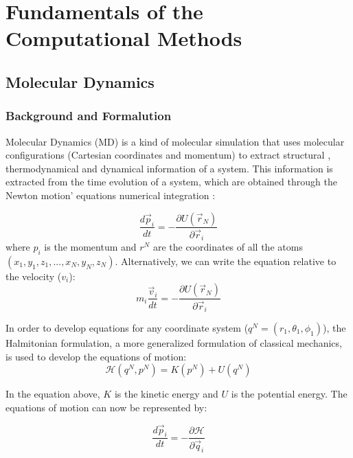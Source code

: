 
\chapter{Fundamentals of the Computational Methods} %

\label{Chapter3} %

\section{Molecular Dynamics}

\subsection{Background and Formalution}
Molecular Dynamics (MD) is a kind of molecular simulation that uses molecular configurations (Cartesian coordinates and momentum) to extract structural , thermodynamical and dynamical information of a system. This information is extracted from the time evolution of a system, which are obtained  through the Newton motion' equations  numerical integration \cite{tuckerman}:

\begin{equation}
\frac{d \vec{p}_{i}}{dt} = - \frac{\partial U (\vec{r}_{N})}{\partial \vec{r}_{i}}
\end{equation}
where $p_{i}$ is the momentum and $r^{N}$ are the coordinates of all the atoms$(x_{1},y_{1},z_{1},...,x_{N},y_{N},z_{N})$. Alternatively, we can write the equation relative to the velocity ($v_{i}$):
\begin{equation}
m_{i} \frac{\vec{v}_{i}}{dt} = - \frac{\partial U (\vec{r}_{N})}{\partial \vec{r}_{i}}
\end{equation}

In order to develop equations for any coordinate system ($q^{N}=(r_{1},\theta _{1},\phi _{1})$), the Halmitonian formulation, a more generalized formulation of classical mechanics,  is used to develop the equations of motion:
\begin{equation}
\mathcal{H} (q^{N},p^{N}) = K(p^{N}) + U(q^{N}) 
\end{equation}

In the equation above, $K$ is the kinetic energy and $U$ is the potential energy. The equations of motion can now be represented by:

\begin{equation}
\frac{d \vec{p}_{i}}{dt} = - \frac{\partial \mathcal{H}}{\partial \vec{q}_{i}}
\end{equation}

